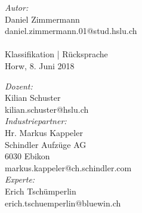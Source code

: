 \begin{titlepage}
\begin{center}
		\begin{minipage}[t]{0.48\textwidth}
			\raggedright						
			\emph{Autor:}\\
			Daniel Zimmermann\\
			daniel.zimmermann.01@stud.hslu.ch\\
			\hfill \break
			\\[4.4cm]
			{\large Klassifikation | Rücksprache\\ 
				Horw, 
				8. Juni 2018}
		\end{minipage}%
		\hfill
		\begin{minipage}[t]{0.48\textwidth}
			\raggedleft
			\emph{Dozent:} \\
			Kilian Schuster \\
			kilian.schuster@hslu.ch\\[1.0cm]
			\emph{Industriepartner:} \\
			Hr. Markus Kappeler \\
			Schindler Aufzüge AG \\
			6030 Ebikon\\
			markus.kappeler@ch.schindler.com\\[1.0cm]
			\emph{Experte:}\\
			Erich Tschümperlin\\
			erich.tschuemperlin@bluewin.ch\\
		\end{minipage}%
		\par\endgroup
		\hfill
		
	\end{center}	
\end{titlepage}
